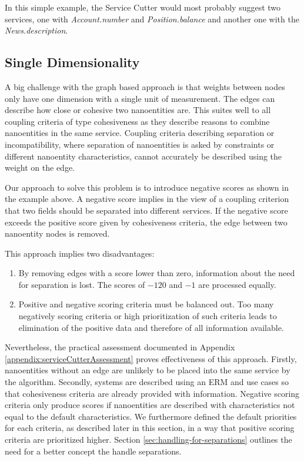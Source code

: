 In this simple example, the Service Cutter would most probably suggest two services, one with \textit{Account.number} and \textit{Position.balance} and another one with the \textit{News.description}.

\subsection{Single Dimensionality}
\label{subsec:singleDimensionality}

A big challenge with the graph based approach is that weights between nodes only have one dimension with a single unit of measurement. The edges can describe how close or cohesive two nanoentities are. This suites well to all coupling criteria of type cohesiveness as they describe reasons to combine nanoentities in the same service. Coupling criteria describing separation or incompatibility, where separation of nanoentities is asked by constraints or different nanoentity characteristics, cannot accurately be described using the weight on the edge.

Our approach to solve this problem is to introduce negative scores as shown in the example above. A negative score implies in the view of a coupling criterion that two fields should be separated into different services. If the negative score exceeds the positive score given by cohesiveness criteria, the edge between two nanoentity nodes is removed. 

This approach implies two disadvantages:

\begin{enumerate}
	\item By removing edges with a score lower than zero, information  about the need for separation is lost. The scores of $-120$ and $-1$ are processed equally. 
	\item Positive and negative scoring criteria must be balanced out. Too many negatively scoring criteria or high prioritization of such criteria leads to elimination of the positive data and therefore of all information available. 
\end{enumerate}


Nevertheless, the practical assessment documented in Appendix \ref{appendix:serviceCutterAssessment} proves effectiveness of this approach. Firstly, nanoentities without an edge are unlikely to be placed into the same service by the algorithm. Secondly, systems are described using an \gls{ERM} and use cases so that cohesiveness criteria are already provided with information. Negative scoring criteria only produce scores if nanoentities are described with characteristics not equal to the default characteristics. We furthermore defined the default priorities for each criteria, as described later in this section, in a way that positive scoring criteria are prioritized higher. Section \ref{sec:handling-for-separations} outlines the need for a better concept the handle separations.

